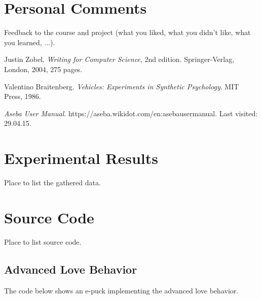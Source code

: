 \documentclass[12pt,a4paper]{article}
\begin{document}
\section*{Personal Comments}
Feedback to the course and project (what you liked, what you didn't like, what you learned, ...).

\begin{thebibliography}{20}
Justin Zobel.											%
\textit{Writing for Computer Science}, 2nd edition.		%
Springer-Verlag, London, 2004, 275 pages.				%

Valentino Braitenberg.									%
\textit{Vehicles: Experiments in Synthetic Psychology}.	%
MIT Press, 1986.										%

\textit{Aseba User Manual}.										%
https://aseba.wikidot.com/en:asebausermanual.			%
Last visited: 29.04.15.									%
\end{thebibliography}
\appendix
\renewcommand{\thesection}{Appendix \Alph{section}}
\renewcommand{\thesubsection}{\Alph{section}.\arabic{subsection}}

\clearpage

\section{Experimental Results}
Place to list the gathered data.

\section{Source Code} \label{app:sourceCode}
Place to list source code.

\subsection{Advanced Love Behavior} \label{app:advLove} %
The code below shows an e-puck implementing the advanced love behavior.

\end{document}
